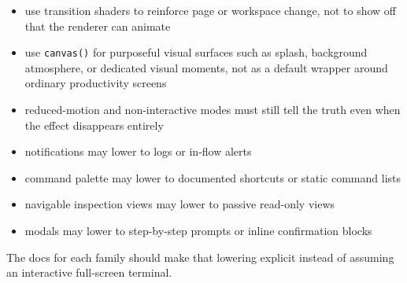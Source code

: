 \begin{itemize}
\item
  use transition shaders to reinforce page or workspace change, not to show off that the renderer can animate
\item
  use \texttt{c\allowbreak{}a\allowbreak{}n\allowbreak{}v\allowbreak{}a\allowbreak{}s\allowbreak{}(\allowbreak{})} for purposeful visual surfaces such as splash, background atmosphere, or dedicated visual moments, not as a default wrapper around ordinary productivity screens
\item
  reduced-motion and non-interactive modes must still tell the truth even when the effect disappears entirely
\item
  notifications may lower to logs or in-flow alerts
\item
  command palette may lower to documented shortcuts or static command lists
\item
  navigable inspection views may lower to passive read-only views
\item
  modals may lower to step-by-step prompts or inline confirmation blocks
\end{itemize}

The docs for each family should make that lowering explicit instead of assuming an interactive full-screen terminal.

